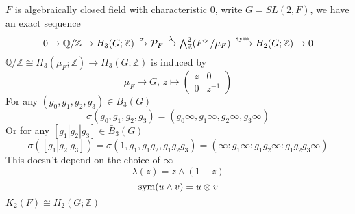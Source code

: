 \documentclass[../main.tex]{subfiles}
\begin{document}
\begin{theorem}
$F$ is algebraically closed field with characteristic $0$, write $G=SL(2,F)$, we have an exact sequence
\[0\to\mathbb Q/\mathbb Z\to H_3(G;\mathbb Z)\xrightarrow\sigma \mathcal P_F\xrightarrow\lambda\textstyle \bigwedge^2_{\mathbb Z}(F^\times/\mu_F)\xrightarrow{\operatorname{sym}} H_2(G;\mathbb Z)\to 0\]
$\mathbb Q/\mathbb Z\cong H_3(\mu_F;\mathbb Z)\to H_3(G;\mathbb Z)$ is induced by
\[\mu_F\to G,\,z\mapsto\begin{pmatrix}
z&0\\
0&z^{-1}
\end{pmatrix}\]
For any $(g_0,g_1,g_2,g_3)\in B_3(G)$
\[\sigma(g_0,g_1,g_2,g_3)=(g_0\infty,g_1\infty,g_2\infty,g_3\infty)\]
Or for any $[g_1|g_2|g_3]\in\bar B_3(G)$
\[\sigma([g_1|g_2|g_3])=\sigma(1,g_1,g_1g_2,g_1g_2g_3)=(\infty:g_1\infty: g_1g_2\infty: g_1g_2g_3\infty)\]
This doesn't depend on the choice of $\infty$
\[\lambda(z)=z\wedge(1-z)\]
\[\operatorname{sym}(u\wedge v)=u\otimes v\]
$K_2(F)\cong H_2(G;\mathbb Z)$
\end{theorem}
\end{document}
